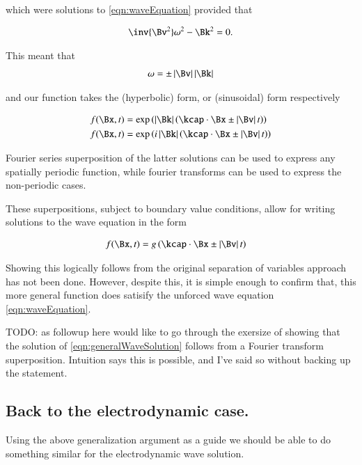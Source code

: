 \documentclass{article}
\begin{document}
which were solutions to \ref{eqn:waveEquation} provided that

\begin{align*}
\inv{\Bv^2} \omega^2 - \Bk^2 = 0.
\end{align*}

This meant that 
\begin{align*}
\omega = \pm \Abs{\Bv} \Abs{\Bk}
\end{align*}

and our function takes the (hyperbolic) form, or (sinusoidal) form respectively

\begin{align*}
f(\Bx,t) &= \exp\left( \Abs{\Bk}\left( \kcap \cdot \Bx \pm \Abs{\Bv} t \right) \right) \\
f(\Bx,t) &= \exp\left( i \Abs{\Bk}\left( \kcap \cdot \Bx \pm \Abs{\Bv} t \right) \right)
\end{align*}

Fourier series superposition of the latter solutions can be used to express any spatially periodic function, while fourier transforms 
can be used to express the non-periodic cases.

These superpositions, subject to boundary value conditions, allow for writing solutions to the wave equation in the form

\begin{align}\label{eqn:generalWaveSolution}
f(\Bx,t) &= g\left( \kcap \cdot \Bx \pm \Abs{\Bv} t \right)
\end{align}

Showing this logically follows from the original separation of variables approach has not been done.   However, despite this,
it is
simple enough to confirm that,
this more general function does satisify the unforced wave equation \ref{eqn:waveEquation}.

TODO: as followup here would like to go through the exersize of showing 
that the solution of \ref{eqn:generalWaveSolution} follows from a Fourier transform superposition.  Intuition says this is
possible, and I've said so without backing up the statement.

\subsection{ Back to the electrodynamic case. }

Using the above generalization argument as a guide we should be able to do something similar for the electrodynamic wave solution.
\end{document}
